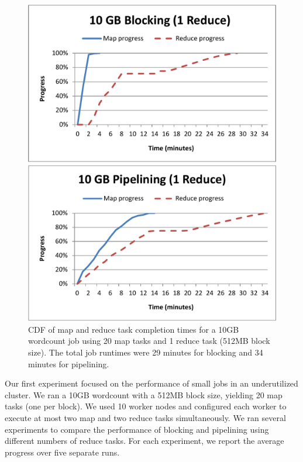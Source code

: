 \begin{figure}[t]
\ssp
\begin{minipage}{0.5\linewidth}
  \centering
        \includegraphics[width=0.95\linewidth]{figures/wc_10gb_20m1r_blocking}
\end{minipage}
\begin{minipage}{0.5\linewidth}
  \centering
        \includegraphics[width=0.95\linewidth]{figures/wc_10gb_20m1r_pipeline}
\end{minipage}
\caption{CDF of map and reduce task completion times for a 10GB wordcount job
  using 20 map tasks and 1 reduce task (512MB block size). The total job
  runtimes were 29 minutes for blocking and 34 minutes for pipelining.}
\label{ch:hop:fig:wc3}
\end{figure}


Our first experiment focused on the performance of small jobs in an
underutilized cluster.  We ran a 10GB wordcount with a 512MB block size,
yielding 20 map tasks (one per block).  We used 10 worker nodes and configured
each worker to execute at most two map and two reduce tasks simultaneously.  We
ran several experiments to compare the performance of blocking and pipelining
using different numbers of reduce tasks.  For each experiment, we report the
average progress over five separate runs. 

